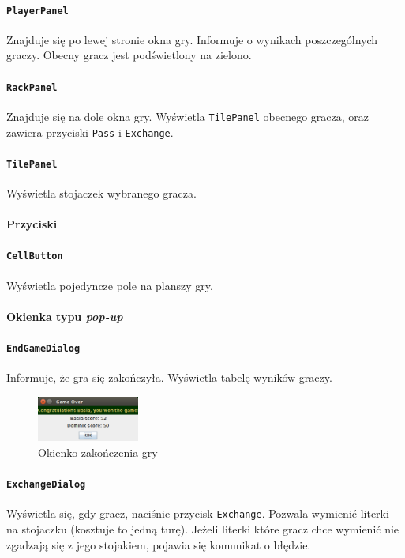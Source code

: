 \documentclass[a4paper]{article}
\begin{document}
\paragraph{\texttt{PlayerPanel}} Znajduje się po lewej stronie okna gry. Informuje o wynikach poszczególnych graczy. Obecny gracz jest podświetlony na zielono.
\paragraph{\texttt{RackPanel}} Znajduje się na dole okna gry. Wyświetla \texttt{TilePanel} obecnego gracza, oraz zawiera przyciski \texttt{Pass} i \texttt{Exchange}.
\paragraph{\texttt{TilePanel}} Wyświetla stojaczek wybranego gracza.
\paragraph{Przyciski}
\paragraph{\texttt{CellButton}} Wyświetla pojedyncze pole na planszy gry.

\newpage
\paragraph{Okienka typu \textit{pop-up}}
\paragraph{\texttt{EndGameDialog}} Informuje, że gra się zakończyła. Wyświetla tabelę wyników graczy.

\begin{figure}[ht]
\centering
\includegraphics[width=0.3\textwidth]{3.png}
\caption{Okienko zakończenia gry}
\end{figure}

\paragraph{\texttt{ExchangeDialog}} Wyświetla się, gdy gracz, naciśnie przycisk \texttt{Exchange}. Pozwala wymienić literki na stojaczku (kosztuje to jedną turę).
Jeżeli literki które gracz chce wymienić nie zgadzają się z jego stojakiem, pojawia się komunikat o błędzie.
\end{document}
